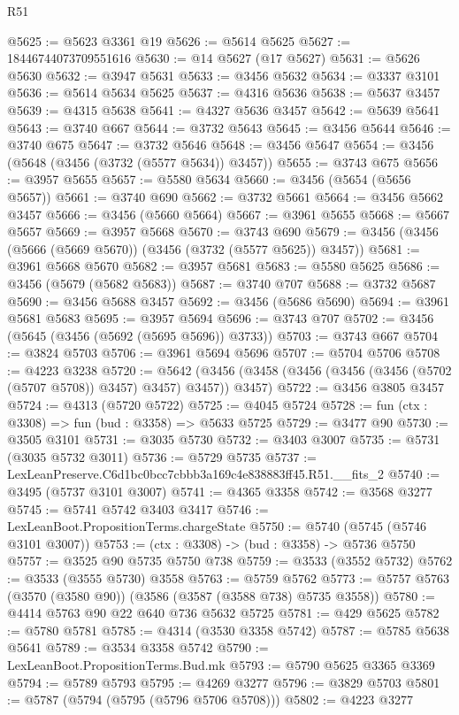 \begin{lexlean}{R51}
\begin{coremodule}
@5625 := @5623 @3361 @19
@5626 := @5614 @5625
@5627 := 18446744073709551616
@5630 := @14 @5627 (@17 @5627)
@5631 := @5626 @5630
@5632 := @3947 @5631
@5633 := @3456 @5632
@5634 := @3337 @3101
@5636 := @5614 @5634 @5625
@5637 := @4316 @5636
@5638 := @5637 @3457
@5639 := @4315 @5638
@5641 := @4327 @5636 @3457
@5642 := @5639 @5641
@5643 := @3740 @667
@5644 := @3732 @5643
@5645 := @3456 @5644
@5646 := @3740 @675
@5647 := @3732 @5646
@5648 := @3456 @5647
@5654 := @3456 (@5648 (@3456 (@3732 (@5577 @5634)) @3457))
@5655 := @3743 @675
@5656 := @3957 @5655
@5657 := @5580 @5634
@5660 := @3456 (@5654 (@5656 @5657))
@5661 := @3740 @690
@5662 := @3732 @5661
@5664 := @3456 @5662 @3457
@5666 := @3456 (@5660 @5664)
@5667 := @3961 @5655
@5668 := @5667 @5657
@5669 := @3957 @5668
@5670 := @3743 @690
@5679 := @3456 (@3456 (@5666 (@5669 @5670)) (@3456 (@3732 (@5577 @5625)) @3457))
@5681 := @3961 @5668 @5670
@5682 := @3957 @5681
@5683 := @5580 @5625
@5686 := @3456 (@5679 (@5682 @5683))
@5687 := @3740 @707
@5688 := @3732 @5687
@5690 := @3456 @5688 @3457
@5692 := @3456 (@5686 @5690)
@5694 := @3961 @5681 @5683
@5695 := @3957 @5694
@5696 := @3743 @707
@5702 := @3456 (@5645 (@3456 (@5692 (@5695 @5696)) @3733))
@5703 := @3743 @667
@5704 := @3824 @5703
@5706 := @3961 @5694 @5696
@5707 := @5704 @5706
@5708 := @4223 @3238
@5720 := @5642 (@3456 (@3458 (@3456 (@3456 (@3456 (@5702 (@5707 @5708)) @3457) @3457) @3457)) @3457)
@5722 := @3456 @3805 @3457
@5724 := @4313 (@5720 @5722)
@5725 := @4045 @5724
@5728 := fun (ctx : @3308) => fun (bud : @3358) => @5633 @5725
@5729 := @3477 @90
@5730 := @3505 @3101
@5731 := @3035 @5730
@5732 := @3403 @3007
@5735 := @5731 (@3035 @5732 @3011)
@5736 := @5729 @5735
@5737 := LexLeanPreserve.C6d1bc0bcc7cbbb3a169c4e838883ff45.R51.__fits_2
@5740 := @3495 (@5737 @3101 @3007)
@5741 := @4365 @3358
@5742 := @3568 @3277
@5745 := @5741 @5742 @3403 @3417
@5746 := LexLeanBoot.PropositionTerms.chargeState
@5750 := @5740 (@5745 (@5746 @3101 @3007))
@5753 := (ctx : @3308) -> (bud : @3358) -> @5736 @5750
@5757 := @3525 @90 @5735 @5750 @738
@5759 := @3533 (@3552 @5732)
@5762 := @3533 (@3555 @5730) @3558
@5763 := @5759 @5762
@5773 := @5757 @5763 (@3570 (@3580 @90)) (@3586 (@3587 (@3588 @738) @5735 @3558))
@5780 := @4414 @5763 @90 @22 @640 @736 @5632 @5725
@5781 := @429 @5625
@5782 := @5780 @5781
@5785 := @4314 (@3530 @3358 @5742)
@5787 := @5785 @5638 @5641
@5789 := @3534 @3358 @5742
@5790 := LexLeanBoot.PropositionTerms.Bud.mk
@5793 := @5790 @5625 @3365 @3369
@5794 := @5789 @5793
@5795 := @4269 @3277
@5796 := @3829 @5703
@5801 := @5787 (@5794 (@5795 (@5796 @5706 @5708)))
@5802 := @4223 @3277

\end{coremodule}
\end{lexlean}
